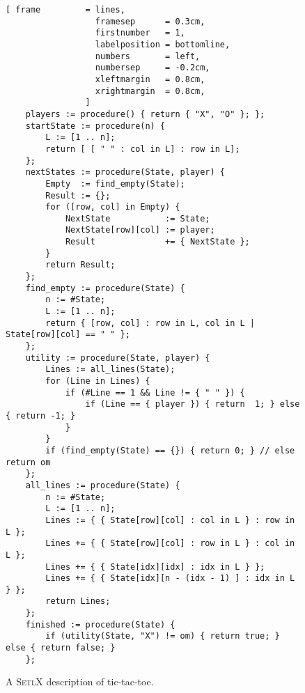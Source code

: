\begin{figure}[!ht]
\centering
\begin{Verbatim}[ frame         = lines, 
                  framesep      = 0.3cm, 
                  firstnumber   = 1,
                  labelposition = bottomline,
                  numbers       = left,
                  numbersep     = -0.2cm,
                  xleftmargin   = 0.8cm,
                  xrightmargin  = 0.8cm,
                ]
    players := procedure() { return { "X", "O" }; };
    startState := procedure(n) {
        L := [1 .. n];
        return [ [ " " : col in L] : row in L];
    };
    nextStates := procedure(State, player) {
        Empty  := find_empty(State);
        Result := {};
        for ([row, col] in Empty) {
            NextState           := State;
            NextState[row][col] := player;
            Result              += { NextState };
        }
        return Result;
    };
    find_empty := procedure(State) {
        n := #State;
        L := [1 .. n];
        return { [row, col] : row in L, col in L | State[row][col] == " " };
    };
    utility := procedure(State, player) {
        Lines := all_lines(State);
        for (Line in Lines) {
            if (#Line == 1 && Line != { " " }) {
                if (Line == { player }) { return  1; } else { return -1; }
            }
        }
        if (find_empty(State) == {}) { return 0; } // else return om
    };
    all_lines := procedure(State) {
        n := #State;
        L := [1 .. n];
        Lines := { { State[row][col] : col in L } : row in L };
        Lines += { { State[row][col] : row in L } : col in L };
        Lines += { { State[idx][idx] : idx in L } };
        Lines += { { State[idx][n - (idx - 1) ] : idx in L } };
        return Lines;
    };
    finished := procedure(State) {
        if (utility(State, "X") != om) { return true; } else { return false; }
    };
\end{Verbatim}
\vspace*{-0.3cm}
\caption{A \textsc{SetlX} description of tic-tac-toe.}
\label{fig:ttt.stlx}
\end{figure}
 

